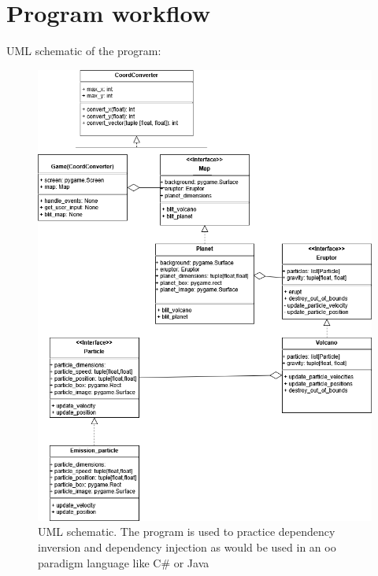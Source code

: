\documentclass[12pt]{article}
\begin{document}
    \section{Program workflow}
    UML schematic of the program:
    \begin{figure}
        \label{uml_scheme}
        \centering
        \caption{UML schematic. The program is used to practice dependency
            inversion and dependency injection as would be used in an oo 
            paradigm language like C\# or Java
        }
        \includegraphics[scale=.6]{uml_chart.png}
    \end{figure}
\end{document}
